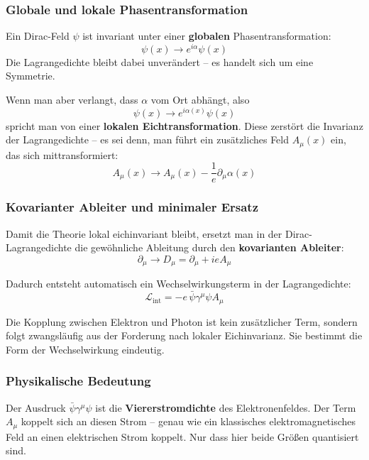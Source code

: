 \subsubsection*{Globale und lokale Phasentransformation}
Ein Dirac-Feld $\psi$ ist invariant unter einer \textbf{globalen} Phasentransformation:
\[
\psi(x) \rightarrow e^{i\alpha} \psi(x)
\]
Die Lagrangedichte bleibt dabei unverändert – es handelt sich um eine Symmetrie.

Wenn man aber verlangt, dass $\alpha$ vom Ort abhängt, also
\[
\psi(x) \rightarrow e^{i\alpha(x)} \psi(x)
\]
spricht man von einer \textbf{lokalen Eichtransformation}. Diese zerstört die Invarianz der Lagrangedichte – es sei denn, man führt ein zusätzliches Feld $A_\mu(x)$ ein, das sich mittransformiert:
\[
A_\mu(x) \rightarrow A_\mu(x) - \frac{1}{e} \partial_\mu \alpha(x)
\]

\subsubsection*{Kovarianter Ableiter und minimaler Ersatz}
Damit die Theorie lokal eichinvariant bleibt, ersetzt man in der Dirac-Lagrangedichte die gewöhnliche Ableitung durch den \textbf{kovarianten Ableiter}:
\[
\partial_\mu \rightarrow D_\mu = \partial_\mu + ie A_\mu
\]

Dadurch entsteht automatisch ein Wechselwirkungsterm in der Lagrangedichte:
\[
\mathcal{L}_{\text{int}} = -e \, \bar{\psi} \gamma^\mu \psi A_\mu
\]

\vspace{0.5em}
\begin{tcolorbox}[mathebox, title=Kopplung aus Prinzip]
	\label{box:Kopplung aus Prinzip}
	Die Kopplung zwischen Elektron und Photon ist kein zusätzlicher Term, sondern folgt zwangsläufig aus der Forderung nach lokaler Eichinvarianz. Sie bestimmt die Form der Wechselwirkung eindeutig.
\end{tcolorbox}

\subsubsection*{Physikalische Bedeutung}
Der Ausdruck $\bar{\psi} \gamma^\mu \psi$ ist die \textbf{Viererstromdichte} des Elektronenfeldes. Der Term $A_\mu$ koppelt sich an diesen Strom – genau wie ein klassisches elektromagnetisches Feld an einen elektrischen Strom koppelt. Nur dass hier beide Größen quantisiert sind.

